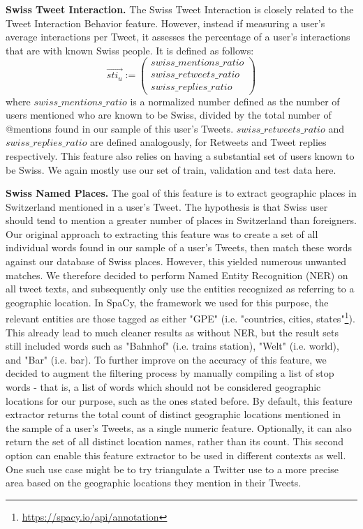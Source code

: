 \documentclass[10pt,a4paper]{article}
\begin{document}
\textbf{Swiss Tweet Interaction.} The Swiss Tweet Interaction is closely related to the Tweet Interaction Behavior feature. However, instead if measuring a user's average interactions per Tweet, it assesses the percentage of a user's interactions that are with known Swiss people. It is defined as follows:
\begin{equation}
\overrightarrow{sti_u} := 
\begin{pmatrix}
swiss\_mentions\_ratio \\ swiss\_retweets\_ratio \\ swiss\_replies\_ratio
\end{pmatrix}
\end{equation}
where $swiss\_mentions\_ratio$ is a normalized number defined as the number of users mentioned who are known to be Swiss, divided by the total number of @mentions found in our sample of this user's Tweets. $swiss\_retweets\_ratio$ and $swiss\_replies\_ratio$ are defined analogously, for Retweets and Tweet replies respectively. This feature also relies on having a substantial set of users known to be Swiss. We again mostly use our set of train, validation and test data here. 

\textbf{Swiss Named Places.} The goal of this feature is to extract geographic places in Switzerland mentioned in a user's Tweet. The hypothesis is that Swiss user should tend to mention a greater number of places in Switzerland than foreigners. Our original approach to extracting this feature was to create a set of all individual words found in our sample of a user's Tweets, then match these words against our database of Swiss places. However, this yielded numerous unwanted matches. We therefore decided to perform Named Entity Recognition (NER) on all tweet texts, and subsequently only use the entities recognized as referring to a geographic location. In SpaCy, the framework we used for this purpose, the relevant entities are those tagged as either  "GPE" (i.e. "countries, cities, states"\footnote{\href{https://spacy.io/api/annotation}{https://spacy.io/api/annotation}}). This already lead to much cleaner results as without NER, but the result sets still included words such as "Bahnhof" (i.e. trains station), "Welt" (i.e. world), and "Bar" (i.e. bar). To further improve on the accuracy of this feature, we decided to augment the filtering process by manually compiling a list of stop words - that is, a list of words which should not be considered geographic locations for our purpose, such as the ones stated before. By default, this feature extractor returns the total count of distinct geographic locations mentioned in the sample of a user's Tweets, as a single numeric feature. Optionally, it can also return the set of all distinct location names, rather than its count. This second option can enable this feature extractor to be used in different contexts as well. One such use case might be to try triangulate a Twitter use to a more precise area based on the geographic locations they mention in their Tweets.
\end{document}
